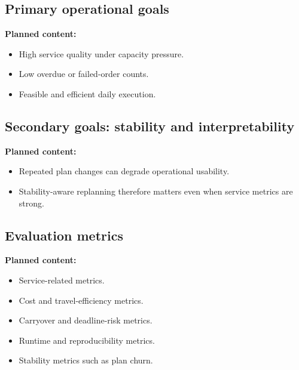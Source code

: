 \subsection{Primary operational goals}
\label{subsec:chapter03_primary_goals}


\noindent\textbf{Planned content:}
\begin{itemize}
    \item High service quality under capacity pressure.
    \item Low overdue or failed-order counts.
    \item Feasible and efficient daily execution.
\end{itemize}

\subsection{Secondary goals: stability and interpretability}
\label{subsec:chapter03_secondary_goals}

%

\noindent\textbf{Planned content:}
\begin{itemize}
    \item Repeated plan changes can degrade operational usability.
    \item Stability-aware replanning therefore matters even when service metrics are strong.
\end{itemize}

\subsection{Evaluation metrics}
\label{subsec:chapter03_evaluation_metrics}

%

\noindent\textbf{Planned content:}
\begin{itemize}
    \item Service-related metrics.
    \item Cost and travel-efficiency metrics.
    \item Carryover and deadline-risk metrics.
    \item Runtime and reproducibility metrics.
    \item Stability metrics such as plan churn.
\end{itemize}

